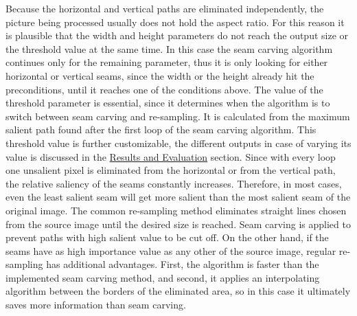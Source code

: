 \documentclass[draft,final]{vutinfth} %
\begin{document}
	Because the horizontal and vertical paths are eliminated independently, the picture being processed usually does not hold the aspect ratio.
	For this reason it is plausible that the width and height parameters do not reach the output size or the threshold value at the same time.
	In this case the seam carving algorithm continues only for the remaining parameter, thus it is only looking for either horizontal or vertical seams, since the width or the height already hit the preconditions, until it reaches one of the conditions above. 
	The value of the threshold parameter is essential,	since it determines when the algorithm is to switch between seam carving and re-sampling. 
	It is calculated from the maximum salient path found after the first loop of the seam carving algorithm.
	This threshold value is further customizable, the different outputs in case of varying its value is discussed in the \hyperref[res:resampling]{Results and Evaluation} section.
	Since with every loop one unsalient pixel is eliminated from the horizontal or from the vertical path, the relative saliency of the seams constantly increases.
	Therefore, in most cases, even the least salient seam will get more salient than the most salient seam of the original image. 
	The common re-sampling method eliminates straight lines chosen from the source image until the desired size is reached.
	Seam carving is applied to prevent paths with high salient value to be cut off.
	On the other hand, if the seams have as high importance value as any other of the source image, regular re-sampling has additional advantages.
	First, the algorithm is faster than the implemented seam carving method, and second, it applies an interpolating algorithm between the borders of the eliminated area, so in this case it ultimately saves more information than seam carving.   
\end{document}
